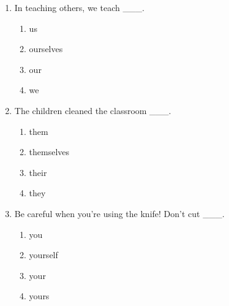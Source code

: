 \documentclass[11pt,a4paper]{ctexart}
\begin{document}
\begin{enumerate}[leftmargin=*,itemsep=4pt]
\item In teaching others, we teach \_\_\_.
\begin{enumerate}[label=\Alph*.,leftmargin=2em,itemsep=1pt,topsep=2pt]
\item us
\item ourselves
\item our
\item we
\end{enumerate}
\item The children cleaned the classroom \_\_\_.
\begin{enumerate}[label=\Alph*.,leftmargin=2em,itemsep=1pt,topsep=2pt]
\item them
\item themselves
\item their
\item they
\end{enumerate}
\item Be careful when you’re using the knife! Don’t cut \_\_\_.
\begin{enumerate}[label=\Alph*.,leftmargin=2em,itemsep=1pt,topsep=2pt]
\item you
\item yourself
\item your
\item yours
\end{enumerate}
\end{enumerate}
\end{document}

